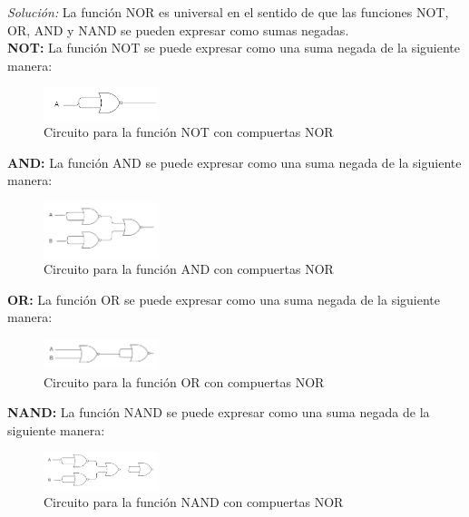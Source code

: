 \documentclass{article}
\newenvironment{solution}
    {\textit{Solución:}}
    {}
\begin{document}
\begin{solution}
La función NOR es universal en el sentido de que las funciones NOT, OR, AND y NAND se pueden expresar como sumas negadas.\\

\textbf{NOT:} La función NOT se puede expresar como una suma negada de la siguiente manera:
\begin{figure}[H]
    \centering
    \includegraphics[width=0.3\textwidth]{tp02fig11.png}
    \caption{Circuito para la función NOT con compuertas NOR}
\end{figure}

\textbf{AND:} La función AND se puede expresar como una suma negada de la siguiente manera:
\begin{figure}[H]
    \centering
    \includegraphics[width=0.3\textwidth]{tp02fig12.png}
    \caption{Circuito para la función AND con compuertas NOR}
\end{figure}

\textbf{OR:} La función OR se puede expresar como una suma negada de la siguiente manera:
\begin{figure}[H]
    \centering
    \includegraphics[width=0.3\textwidth]{tp02fig13.png}
    \caption{Circuito para la función OR con compuertas NOR}
\end{figure}

\textbf{NAND:} La función NAND se puede expresar como una suma negada de la siguiente manera:
\begin{figure}[H]
    \centering
    \includegraphics[width=0.3\textwidth]{tp02fig14.png}
    \caption{Circuito para la función NAND con compuertas NOR}
\end{figure}
\end{solution}
\end{document}
